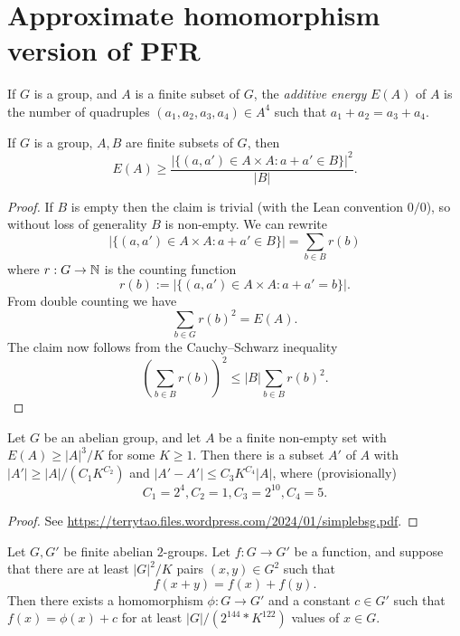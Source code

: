 \chapter{Approximate homomorphism version of PFR}

\begin{definition}
  \label{energy-def}
  \leanok
  If $G$ is a group, and $A$ is a finite subset of $G$, the \emph{additive energy} $E(A)$ of $A$
  is the number of quadruples $(a_1,a_2,a_3,a_4) \in A^4$ such that $a_1+a_2 = a_3+a_4$.
\end{definition}

\begin{lemma}
  \label{cs-bound}
  \leanok

  If $G$ is a group, $A,B$ are finite subsets of $G$, then
  $$E(A) \geq \frac{|\{ (a,a') \in A \times A: a+a' \in B \}|^2}{|B|}.$$
\end{lemma}
\begin{proof}
  \leanok

  If $B$ is empty then the claim is trivial (with the Lean convention $0/0$),
  so without loss of generality $B$ is non-empty.  We can rewrite
  $$ |\{ (a,a') \in A \times A: a+a' \in B \}| = \sum_{b \in B} r(b)$$
  where $r: G \to \mathbb{N}$ is the counting function
  $$ r(b) := |\{ (a,a') \in A \times A: a+a' = b \}|.$$
  From double counting we have
  $$ \sum_{b \in G} r(b)^2 = E(A).$$
  The claim now follows from the Cauchy--Schwarz inequality
  $$ (\sum_{b \in B} r(b))^2 \leq |B| \sum_{b \in B} r(b)^2.$$
\end{proof}

\begin{lemma}
  \label{bsg}
  \leanok

  Let $G$ be an abelian group, and let $A$ be a finite non-empty set
  with $E(A) \geq |A|^3 / K$ for some $K \geq 1$.
  Then there is a subset $A'$ of $A$ with $|A'| \geq |A| / (C_1 K^{C_2})$ and
  $|A'-A'| \leq C_3 K^{C_4} |A|$, where (provisionally)
  $$C_1 = 2^4, C_2 = 1, C_3 = 2^{10}, C_4 = 5.$$
\end{lemma}
\begin{proof}
  \leanok

  See \url{https://terrytao.files.wordpress.com/2024/01/simplebsg.pdf}.
\end{proof}

\begin{theorem}\label{approx-hom-pfr}\leanok Let $G,G'$ be finite abelian $2$-groups.
  Let $f: G \to G'$ be a function, and suppose that there are at least $|G|^2 / K$ pairs $(x,y) \in G^2$ such that
$$ f(x+y) = f(x) + f(y).$$
Then there exists a homomorphism $\phi: G \to G'$ and a constant $c \in G'$
such that $f(x) = \phi(x)+c$ for at least $|G| / (2 ^ {144} * K ^ {122})$
values of $x \in G$.
\end{theorem}

